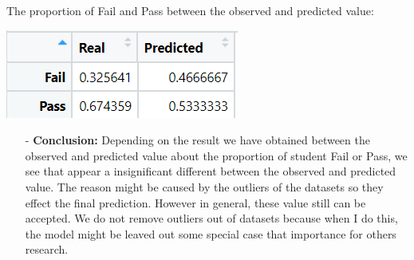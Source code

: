 \documentclass[a4paper]{article}
\numberwithin{equation}{section}
\begin{document}
The proportion of Fail and Pass between the observed and predicted value:

\begin{center}
  {\includegraphics{proportion.PNG}}
\end{center}

\begin{itemize}
  \item[-] \textbf{Conclusion:} Depending on the result we have obtained between the observed and predicted value about the proportion of student Fail or Pass, we see that appear a insignificant different between the observed and predicted value. The reason might be caused by the outliers of the datasets so they effect the final prediction. However in general, these value still can be accepted. We do not remove outliers out of datasets because when I do this, the model might be leaved out some special case that importance for others research.
\end{itemize}

\newpage
\end{document}
